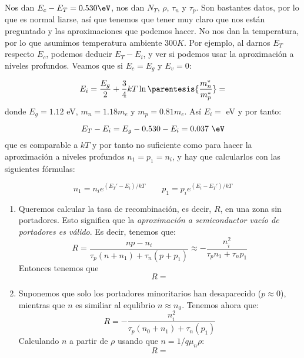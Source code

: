 
	Nos dan $E_c-E_T=0.530\eV$, nos dan $N_T$, $\rho$, $\tau_n$ y $\tau_p$. Son bastantes datos, por lo que es normal liarse, así que tenemos que tener muy claro que nos están preguntado y las aproximaciones que podemos hacer. No nos dan la temperatura, por lo que asumimos temperatura ambiente $300K$. Por ejemplo, al darnos $E_T$ respecto $E_c$, podemos deducir $E_T-E_i$, y ver si podemos usar la aproximación a niveles profundos. Veamos que si $E_c=E_g$ y $E_v=0$:
	
	\begin{equation}
		E_i = \frac{E_g}{2} + \frac{3}{4} kT \ln \parentesis{\frac{m_n^*}{m_p^*}} =
	\end{equation}
	donde $E_g=1.12$ eV, $m_n=1.18m_e$ y $m_p=0.81m_e$. Así $E_i=$ eV y por tanto:

	\begin{equation}
		E_T - E_i = E_g - 0.530 - E_i =0.037 \ \eV		
	\end{equation}
	que es comparable a $kT$ y por tanto no suficiente como para hacer la aproximación a niveles profundos $n_1=p_1=n_i$, y hay que calcularlos con las siguientes fórmulas:

	\begin{equation}
		n_1 = n_i e^{(E_T'-E_i)/kT} 	\qquad
		p_1 = p_i e^{(E_i-E_T')/kT}
	\end{equation}

	\begin{enumerate}[label=\alph*)]
		\item Queremos calcular la tasa de recombinación, es decir, $R$, en una zona sin portadores. Esto significa que la \textit{aproximación a  semiconductor vacío de portadores es válido}. Es decir, tenemos que:
		\begin{equation}
			R = \frac{np-n_i}{\tau_p (n+n_1)+\tau_n (p+p_1)} \approx -\frac{n_i^2}{\tau_p n_1 + \tau_n p_1}
		\end{equation}
		Entonces tenemos que
		\begin{equation}
			R =
		\end{equation}
		\item Suponemos que solo los portadores minoritarios han desaparecido ($p\approx 0$), mientras que $n$ es similiar al equlibrio $n\approx n_0$. Tenemos ahora que:
		\begin{equation}
			R = - \frac{n_i^2}{\tau_p(n_0+n_1)+\tau_n(p_1)}
		\end{equation}
		Calculando $n$ a partir de $\rho$ usando que $n = 1/q\mu_n\rho$:
		\begin{equation}
			R =
		\end{equation}
	\end{enumerate}	

